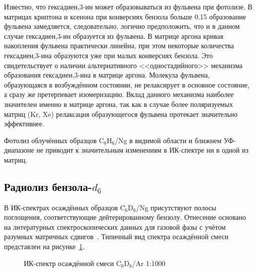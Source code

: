 {Известно, что гексадиен,3\nobreakdash-ин может образовываться из фульвена при фотолизе. В матрицах криптона и ксенона при конверсиях бензола больше 0.15 образование фульвена замедляется, следовательно, логично предположить, что и в данном случае гексадиен,3\nobreakdash-ин образуется из фульвена. В матрице аргона кривая накопления фульвена практически линейна, при этом некоторые количества гексадиен,3\nobreakdash-ина образуются уже при малых конверсиях бензола. Это свидетельствует о наличии альтернативного <<одностадийного>> механизма образования гексадиен,3\nobreakdash-ина в матрице аргона. Молекула фульвена, образующаяся в возбуждённом состоянии, не релаксирует в основное состояние, а сразу же претерпевает изомеризацию. Вклад данного механизма наиболее значителен именно в матрице аргона, так как в случае более поляризуемых матриц (Kr, Xe)  релаксация образующегося фульвена протекает значительно эффективнее.
 
Фотолиз облучённых образцов C$_6$H$_6$/Ng в видимой области и ближнем УФ-диапазоне не приводит к значительным изменениям в ИК-спектре ни в одной из матриц. 

\subsection{Радиолиз бензола-$d_6$}

В ИК-спектрах осаждённых образцов C$_6$D$_6$/Ng присутствуют полосы поглощения, соответствующие дейтерированному бензолу. Отнесение основано на литературных спектроскопических данных для газовой фазы с учётом разумных матричных сдвигов~\cite{Shimanouchi}. 
Типичный вид спектра осаждённой смеси представлен на рисунке~\ref{Ar_d6}. 

 \begin{figure}[H]
\caption{ИК-спектр осаждённой смеси C$_6$D$_6$/Ar 1:1000}
\label{Ar_d6}
\end{figure}


}
